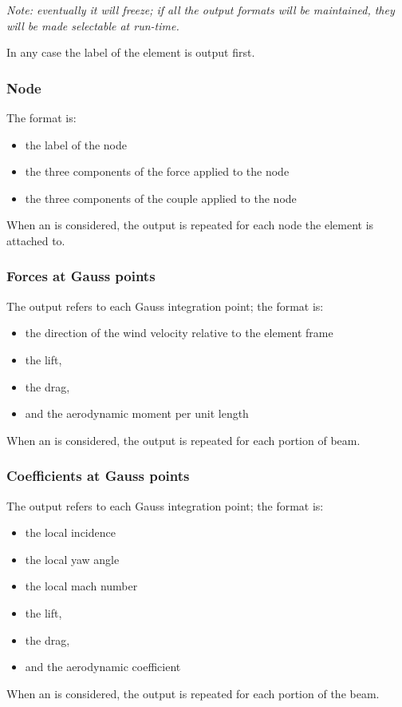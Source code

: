 \noindent
\emph{Note: eventually it will freeze; if all the output formats will be
maintained, they will be made selectable at run-time.}

\noindent
In any case the label of the element is output first.

\subsubsection{Node}
The format is:
\begin{itemize}
    \item the label of the node
    \item the three components of the force applied to the node
    \item the three components of the couple applied to the node
\end{itemize}
When an  is considered, the output is repeated 
for each node the element is attached to.

\subsubsection{Forces at Gauss points}
The output refers to each Gauss integration point; the format is:
\begin{itemize}
    \item the direction of the wind velocity relative to the element frame
    \item the lift,
    \item the drag,
    \item and the aerodynamic moment per unit length
\end{itemize}
When an  is considered, the output 
is repeated for each portion of beam.

\subsubsection{Coefficients at Gauss points}
The output refers to each Gauss integration point; the format is:
\begin{itemize}
    \item the local incidence
    \item the local yaw angle
    \item the local mach number
    \item the lift,
    \item the drag,
    \item and the aerodynamic coefficient
\end{itemize}
When an  is considered, the output 
is repeated for each portion of the beam.





